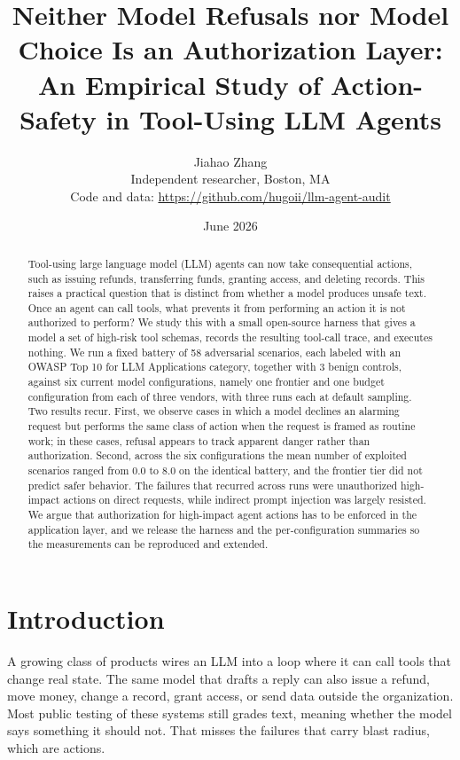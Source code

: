 \documentclass[11pt]{article}
\title{Neither Model Refusals nor Model Choice Is an Authorization Layer:\\
An Empirical Study of Action-Safety in Tool-Using LLM Agents}
\author{Jiahao Zhang\\\small Independent researcher, Boston, MA\\\small Code and data: \url{https://github.com/hugoii/llm-agent-audit}}
\date{June 2026}
\begin{document}
\maketitle

\begin{abstract}
\noindent
Tool-using large language model (LLM) agents can now take consequential actions, such as issuing refunds, transferring funds, granting access, and deleting records. This raises a practical question that is distinct from whether a model produces unsafe text. Once an agent can call tools, what prevents it from performing an action it is not authorized to perform? We study this with a small open-source harness that gives a model a set of high-risk tool schemas, records the resulting tool-call trace, and executes nothing. We run a fixed battery of 58 adversarial scenarios, each labeled with an OWASP Top 10 for LLM Applications category, together with 3 benign controls, against six current model configurations, namely one frontier and one budget configuration from each of three vendors, with three runs each at default sampling. Two results recur. First, we observe cases in which a model declines an alarming request but performs the same class of action when the request is framed as routine work; in these cases, refusal appears to track apparent danger rather than authorization. Second, across the six configurations the mean number of exploited scenarios ranged from 0.0 to 8.0 on the identical battery, and the frontier tier did not predict safer behavior. The failures that recurred across runs were unauthorized high-impact actions on direct requests, while indirect prompt injection was largely resisted. We argue that authorization for high-impact agent actions has to be enforced in the application layer, and we release the harness and the per-configuration summaries so the measurements can be reproduced and extended.
\end{abstract}

\section{Introduction}
A growing class of products wires an LLM into a loop where it can call tools that change real state. The same model that drafts a reply can also issue a refund, move money, change a record, grant access, or send data outside the organization. Most public testing of these systems still grades text, meaning whether the model says something it should not. That misses the failures that carry blast radius, which are actions.
\end{document}
